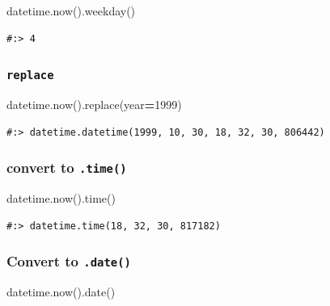 \documentclass[
]{book}
\newenvironment{Shaded}{\begin{snugshade}}{\end{snugshade}}
\newcommand{\DecValTok}[1]{\textcolor[rgb]{0.06,0.06,0.06}{#1}}
\newcommand{\NormalTok}[1]{#1}
\newcommand{\OperatorTok}[1]{\textcolor[rgb]{0.43,0.43,0.43}{\textbf{#1}}}
\begin{document}
\begin{Shaded}
\begin{Highlighting}[]
\NormalTok{datetime.now().weekday()}
\end{Highlighting}
\end{Shaded}

\begin{verbatim}
#:> 4
\end{verbatim}

\hypertarget{replace-1}{%
\subsubsection{\texorpdfstring{\texttt{replace}}{replace}}\label{replace-1}}

\begin{Shaded}
\begin{Highlighting}[]
\NormalTok{datetime.now().replace(year}\OperatorTok{=}\DecValTok{1999}\NormalTok{)}
\end{Highlighting}
\end{Shaded}

\begin{verbatim}
#:> datetime.datetime(1999, 10, 30, 18, 32, 30, 806442)
\end{verbatim}

\hypertarget{convert-to-.time}{%
\subsubsection{\texorpdfstring{convert to \texttt{.time()}}{convert to .time()}}\label{convert-to-.time}}

\begin{Shaded}
\begin{Highlighting}[]
\NormalTok{datetime.now().time()}
\end{Highlighting}
\end{Shaded}

\begin{verbatim}
#:> datetime.time(18, 32, 30, 817182)
\end{verbatim}

\hypertarget{convert-to-.date}{%
\subsubsection{\texorpdfstring{Convert to \texttt{.date()}}{Convert to .date()}}\label{convert-to-.date}}

\begin{Shaded}
\begin{Highlighting}[]
\NormalTok{datetime.now().date()}
\end{Highlighting}
\end{Shaded}
\end{document}
